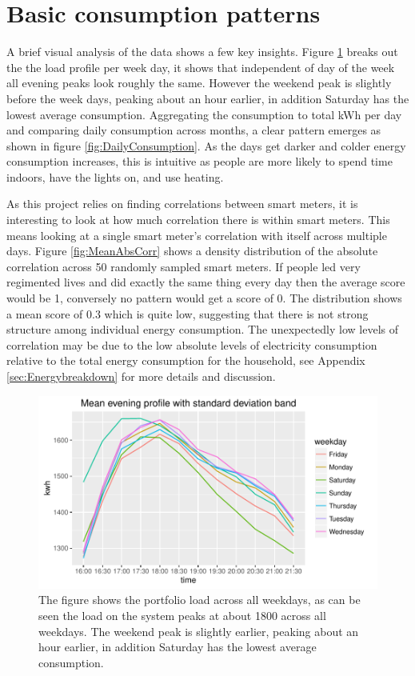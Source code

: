 \FloatBarrier

\section{Basic consumption patterns}
\label{sec:basicconsum}
A brief visual analysis of the data shows a few key insights. Figure \ref{fig:PortfolioLoad} breaks out the the load profile per week day, it shows that independent of day of the week all evening peaks look roughly the same. However the weekend peak is slightly before the week days, peaking about an hour earlier, in addition Saturday has the lowest average consumption. Aggregating the consumption to total kWh per day and comparing daily consumption across months, a clear pattern emerges as shown in figure \ref{fig:DailyConsumption}. As the days get darker and colder energy consumption increases, this is intuitive as people are more likely to spend time indoors, have the lights on, and use heating. 

As this project relies on finding correlations between smart meters, it is interesting to look at how much correlation there is within smart meters. This means looking at a single smart meter's correlation with itself across multiple days. Figure \ref{fig:MeanAbsCorr} shows a density distribution of the absolute correlation across 50 randomly sampled smart meters. If people led very regimented lives and did exactly the same thing every day then the average score would be 1, conversely no pattern would get a score of 0. The distribution shows a mean score of 0.3 which is quite low, suggesting that there is not strong structure among individual energy consumption. The unexpectedly low levels of correlation may be due to the low absolute levels of electricity consumption relative to the total energy consumption for the household, see Appendix \ref{sec:Energybreakdown} for more details and discussion. 


\begin{figure}
    \centering
    \includegraphics[width = \textwidth]{Figures/Results/PortfolioLoad}
    \caption[Portfolio load by day]{The figure shows the portfolio load across all weekdays, as can be seen the load on the system peaks at about 1800 across all weekdays. The weekend peak is slightly earlier, peaking about an hour earlier, in addition Saturday has the lowest average consumption.}
    \label{fig:PortfolioLoad}
\end{figure}


